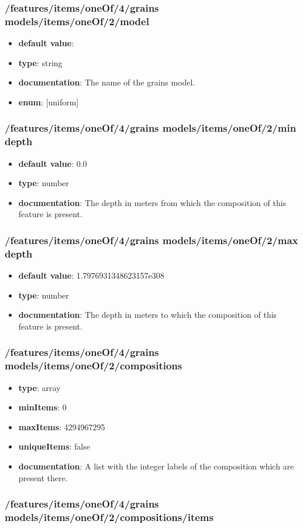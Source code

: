 \subsubsection{/features/items/oneOf/4/grains models/items/oneOf/2/model}
\begin{itemize}\item {\bf default value}: 
\item {\bf type}: string
\item {\bf documentation}: The name of the grains model.
\item {\bf enum}: [uniform]\end{itemize}\subsubsection{/features/items/oneOf/4/grains models/items/oneOf/2/min depth}
\begin{itemize}\item {\bf default value}: 0.0
\item {\bf type}: number
\item {\bf documentation}: The depth in meters from which the composition of this feature is present.
\end{itemize}\subsubsection{/features/items/oneOf/4/grains models/items/oneOf/2/max depth}
\begin{itemize}\item {\bf default value}: 1.7976931348623157e308
\item {\bf type}: number
\item {\bf documentation}: The depth in meters to which the composition of this feature is present.
\end{itemize}\subsubsection{/features/items/oneOf/4/grains models/items/oneOf/2/compositions}
\begin{itemize}\item {\bf type}: array
\item {\bf minItems}: 0
\item {\bf maxItems}: 4294967295
\item {\bf uniqueItems}: false
\item {\bf documentation}: A list with the integer labels of the composition which are present there.
\end{itemize}\subsubsection{/features/items/oneOf/4/grains models/items/oneOf/2/compositions/items}
